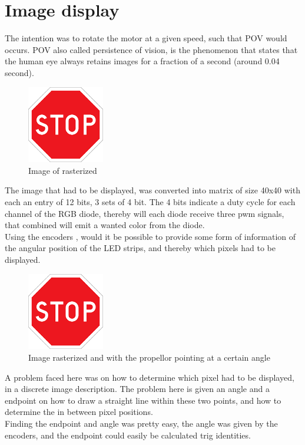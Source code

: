 \section{Image display}
The intention was to rotate the motor at a given speed, such that POV would occurs. POV also called persistence of vision, is the phenomenon that states that the human eye  
always retains images for a fraction of a second (around 0.04 second). \cite{pov}

\begin{figure}[H]
		\centering
		\includegraphics[width =0.3\textwidth]{images/stop}
		\caption{Image of rasterized}
		\label{fig:}
\end{figure}

The image that had to be displayed, was converted into matrix of size 40x40 with each an entry of 12 bits, 3 sets of 4 bit. The 4 bits indicate a duty cycle  for each channel of the RGB diode, thereby will each diode receive three pwm signals, that combined will emit a wanted color from the diode.  \\
Using the encoders , would it be  possible to provide some form of information of the angular position of the LED strips, and thereby which pixels had to be displayed. 

\begin{figure}[H]
		\centering
		\includegraphics[width =0.3\textwidth]{images/stop}
		\caption{Image rasterized and with the propellor pointing at a certain angle}
		\label{fig:}
\end{figure}
A problem faced here was on how to determine which pixel had to be displayed, in a discrete image description. The problem here is given an angle and a endpoint on how to draw a straight line within these two points, and how to determine the in between pixel positions. \\
Finding the endpoint and angle was pretty easy, the angle was given by the encoders, and the endpoint could easily be calculated trig identities. \\

